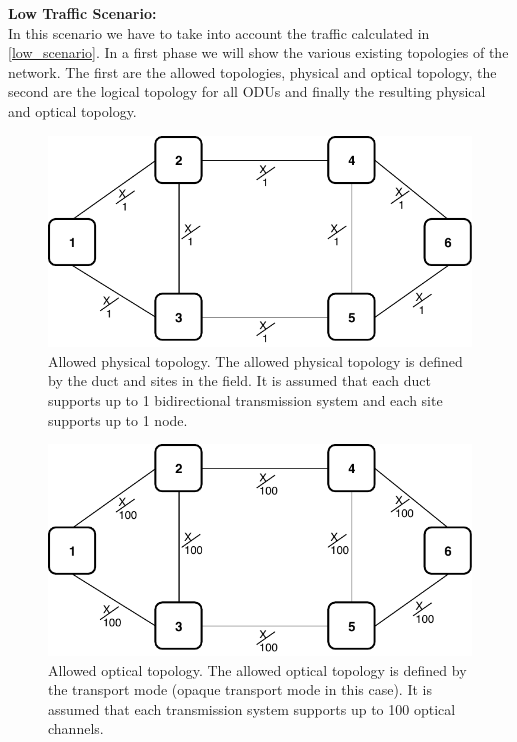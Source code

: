 \textbf{Low Traffic Scenario:}\\

In this scenario we have to take into account the traffic calculated in \ref{low_scenario}. In a first phase we will show the various existing topologies of the network. The first are the allowed topologies, physical and optical topology, the second are the logical topology for all ODUs and finally the resulting physical and optical topology.\\

\newpage
\vspace{20pt}
\begin{figure}[h!]
\centering
\includegraphics[width=13cm]{sdf/ilp/opaque_survivability/figures/allowed_physical_topology}
\caption{Allowed physical topology. The allowed physical topology is defined by the duct and sites in the field. It is assumed that each duct supports up to 1 bidirectional transmission system and each site supports up to 1 node.}
\label{allowed_physical_low}
\end{figure}

\vspace{20pt}
\begin{figure}[h!]
\centering
\includegraphics[width=13cm]{sdf/ilp/opaque_survivability/figures/allowed_optical_topology}
\caption{Allowed optical topology. The allowed optical topology is defined by the transport mode (opaque transport mode in this case). It is assumed that each transmission system supports up to 100 optical channels.}
\label{allowed_optical_low}
\end{figure}

